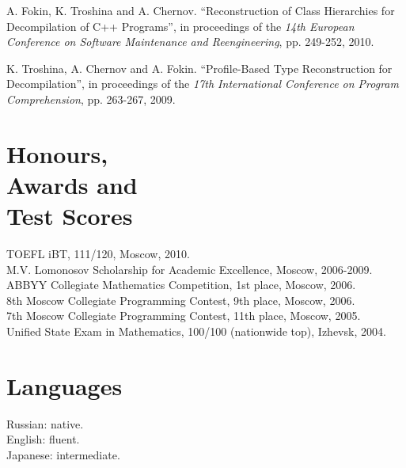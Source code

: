 \documentclass[margin,line]{CV}
\begin{document}
\begin{resume}
    A. Fokin, K. Troshina and A. Chernov. ``Reconstruction of Class Hierarchies for Decompilation of C++ Programs'',
    in proceedings of the \textsl{14th European Conference on Software Maintenance and Reengineering}, pp. 249-252, 2010.

    K. Troshina, A. Chernov and A. Fokin. ``Profile-Based Type Reconstruction for Decompilation'',
    in proceedings of the \textsl{17th International Conference on Program Comprehension}, pp. 263-267, 2009.


    \section{\mysidestyle Honours, \\Awards and \\Test Scores}
    TOEFL iBT, 111/120, Moscow, 2010.                                                               \vspace{1mm}\\
    M.V. Lomonosov Scholarship for Academic Excellence, Moscow, 2006-2009.                          \vspace{1mm}\\
    ABBYY Collegiate Mathematics Competition, 1st place, Moscow, 2006.                              \vspace{1mm}\\
    8th Moscow Collegiate Programming Contest, 9th place, Moscow, 2006.                             \vspace{1mm}\\
    7th Moscow Collegiate Programming Contest, 11th place, Moscow, 2005.                            \vspace{1mm}\\
    Unified State Exam in Mathematics, 100/100 (nationwide top), Izhevsk, 2004.                     \vspace{1mm}


    \section{\mysidestyle Languages}
    Russian: native. \\
    English: fluent. \\
    Japanese: intermediate.

\end{resume}
\end{document}
